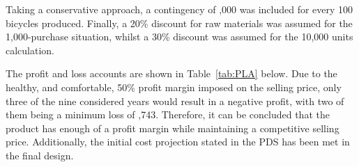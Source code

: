 \documentclass[a4paper,11pt]{article}
\begin{document}
Taking a conservative approach, a contingency of ,000 was included for every 100 bicycles produced. Finally, a 20\% discount for raw materials was assumed for the 1,000-purchase situation, whilst a 30\% discount was assumed for the 10,000 units calculation. 

The profit and loss accounts are shown in Table~\ref{tab:PLA} below. Due to the healthy, and comfortable, 50\% profit margin imposed on the selling price, only three of the nine considered years would result in a negative profit, with two of them being a minimum loss of ,743. Therefore, it can be concluded that the product has enough of a profit margin while maintaining a competitive selling price. Additionally, the initial cost projection stated in the PDS has been met in the final design.  
\end{document}
